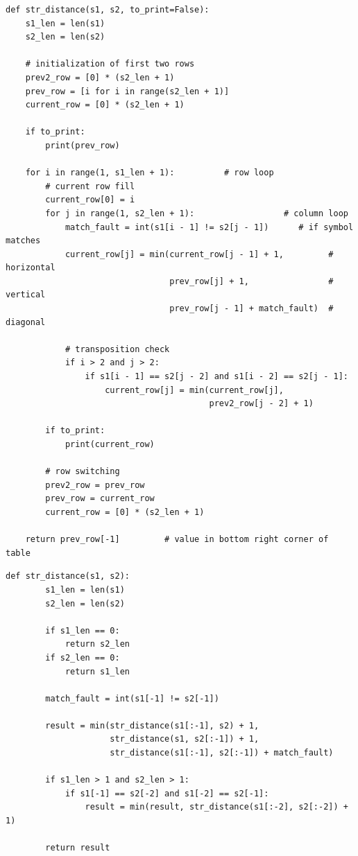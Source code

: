 \documentclass[12pt]{report}
\begin{document}
	\begin{lstlisting}[label=some-code,caption=Расстояние Дамерау-Левенштейна (матрично)]
	def str_distance(s1, s2, to_print=False):
    s1_len = len(s1)
    s2_len = len(s2)

    # initialization of first two rows
    prev2_row = [0] * (s2_len + 1)
    prev_row = [i for i in range(s2_len + 1)]
    current_row = [0] * (s2_len + 1)

    if to_print:
        print(prev_row)

    for i in range(1, s1_len + 1):          # row loop
        # current row fill
        current_row[0] = i
        for j in range(1, s2_len + 1):                  # column loop
            match_fault = int(s1[i - 1] != s2[j - 1])      # if symbol matches
            current_row[j] = min(current_row[j - 1] + 1,         # horizontal
                                 prev_row[j] + 1,                # vertical
                                 prev_row[j - 1] + match_fault)  # diagonal

            # transposition check
            if i > 2 and j > 2:
                if s1[i - 1] == s2[j - 2] and s1[i - 2] == s2[j - 1]:
                    current_row[j] = min(current_row[j],
                                         prev2_row[j - 2] + 1)

        if to_print:
            print(current_row)

        # row switching
        prev2_row = prev_row
        prev_row = current_row
        current_row = [0] * (s2_len + 1)

    return prev_row[-1]         # value in bottom right corner of table
	\end{lstlisting}

	\begin{lstlisting}[label=some-code,caption=Расстояние Дамерау-Левенштейна (рекурсивно)]
		def str_distance(s1, s2):
	    s1_len = len(s1)
	    s2_len = len(s2)
	
	    if s1_len == 0:
	        return s2_len
	    if s2_len == 0:
	        return s1_len
	
	    match_fault = int(s1[-1] != s2[-1])
	
	    result = min(str_distance(s1[:-1], s2) + 1,
	                 str_distance(s1, s2[:-1]) + 1,
	                 str_distance(s1[:-1], s2[:-1]) + match_fault)
	
	    if s1_len > 1 and s2_len > 1:
	        if s1[-1] == s2[-2] and s1[-2] == s2[-1]:
	            result = min(result, str_distance(s1[:-2], s2[:-2]) + 1)
	
	    return result
	\end{lstlisting}
\end{document}
